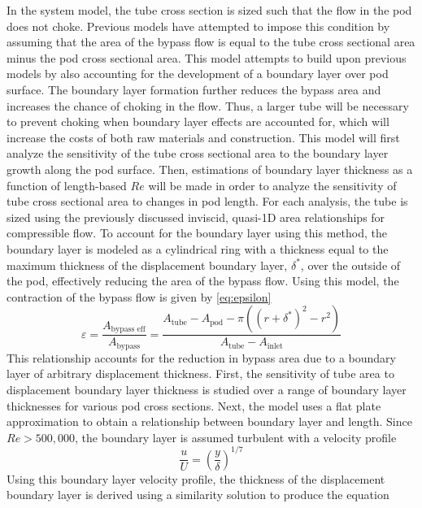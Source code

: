 In the system model, the tube cross section is sized such that the flow in the pod does not choke.
Previous models have attempted to impose this condition by assuming that the
area of the bypass flow is equal to the tube cross sectional area minus the
pod cross sectional area.\cite{Chin} This model attempts to build upon
previous models by also accounting for the development of a boundary layer over pod surface.
The boundary layer formation further reduces the bypass area and increases the
chance of choking in the flow. Thus, a larger tube will be necessary to prevent
choking when boundary layer effects are accounted for, which will increase the
costs of both raw materials and construction. This model will first analyze the
sensitivity of the tube cross sectional area to the boundary layer growth along
the pod surface. Then, estimations of boundary layer thickness as a function of
length-based $Re$ will be made in order to analyze the sensitivity of tube
cross sectional area to changes in pod length.
For each analysis, the tube is sized using the previously discussed inviscid,
quasi-1D area relationships for compressible flow. To account for the boundary
layer using this method, the boundary layer is modeled as a cylindrical ring
with a thickness equal to the maximum thickness of the displacement boundary layer,
$\delta^{*}$, over the outside of the pod, effectively reducing the area of the bypass flow.
Using this model, the contraction of the bypass flow is given by \cref{eq:epsilon}
\begin{equation}
	\label{eq:epsilon}
	\varepsilon  = \frac{A_\text{bypass eff}}{A_\text{bypass}} = \frac{A_\text{tube}-A_\text{pod} -\pi  (  ( r+\delta ^{*}  )^{2}-r^{2}  )}{A_\text{tube}-A_\text{inlet}}
\end{equation}
This relationship accounts for the reduction in bypass area due to a boundary
layer of arbitrary displacement thickness. First, the sensitivity of tube area
to displacement boundary layer thickness is studied over a range of boundary
layer thicknesses for various pod cross sections. Next, the model uses a flat
plate approximation to obtain a relationship between boundary layer and length.
Since $Re > 500,000$, the boundary layer is assumed turbulent with a velocity profile \cite{FoxMcDonald}
\begin{equation}
	\label{eq:boundary_layer_profile}
	\frac{u}{U} = (\frac{y}{\delta })^{1/7}
\end{equation}
Using this boundary layer velocity profile, the thickness of the displacement
boundary layer is derived using a similarity solution to produce the equation \cite{FoxMcDonald}
